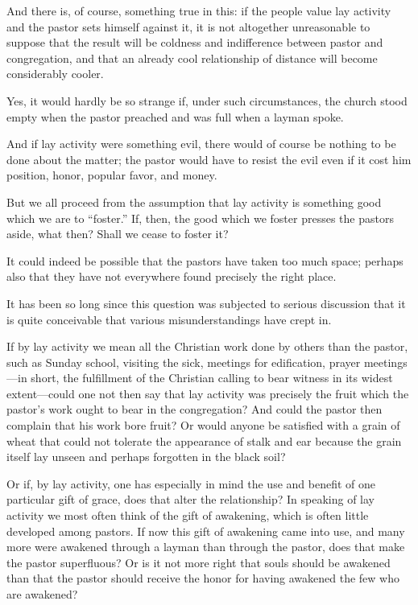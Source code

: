 And there is, of course, something true in this: if the people value lay activity and the pastor sets himself against it, it is not altogether unreasonable to suppose that the result will be coldness and indifference between pastor and congregation, and that an already cool relationship of distance will become considerably cooler.

Yes, it would hardly be so strange if, under such circumstances, the church stood empty when the pastor preached and was full when a layman spoke.

And if lay activity were something evil, there would of course be nothing to be done about the matter; the pastor would have to resist the evil even if it cost him position, honor, popular favor, and money.

But we all proceed from the assumption that lay activity is something good which we are to “foster.” If, then, the good which we foster presses the pastors aside, what then? Shall we cease to foster it?

It could indeed be possible that the pastors have taken too much space; perhaps also that they have not everywhere found precisely the right place.

It has been so long since this question was subjected to serious discussion that it is quite conceivable that various misunderstandings have crept in.

If by lay activity we mean all the Christian work done by others than the pastor, such as Sunday school, visiting the sick, meetings for edification, prayer meetings—in short, the fulfillment of the Christian calling to bear witness in its widest extent—could one not then say that lay activity was precisely the fruit which the pastor’s work ought to bear in the congregation? And could the pastor then complain that his work bore fruit? Or would anyone be satisfied with a grain of wheat that could not tolerate the appearance of stalk and ear because the grain itself lay unseen and perhaps forgotten in the black soil?

Or if, by lay activity, one has especially in mind the use and benefit of one particular gift of grace, does that alter the relationship? In speaking of lay activity we most often think of the gift of awakening, which is often little developed among pastors. If now this gift of awakening came into use, and many more were awakened through a layman than through the pastor, does that make the pastor superfluous? Or is it not more right that souls should be awakened than that the pastor should receive the honor for having awakened the few who are awakened?

